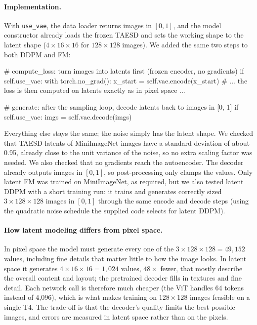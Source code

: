 \documentclass[11pt]{article}
\begin{document}
\paragraph{Implementation.} With \texttt{use\_vae}, the data loader returns images in $[0,1]$, and the
model constructor already loads the frozen TAESD and sets the working shape to the latent shape
($4\times16\times16$ for $128\times128$ images). We added the same two steps to both DDPM and FM:
\begin{codeblock}
# compute_loss: turn images into latents first (frozen encoder, no gradients)
if self.use_vae:
    with torch.no_grad():
        x_start = self.vae.encode(x_start)
# ... the loss is then computed on latents exactly as in pixel space ...

# generate: after the sampling loop, decode latents back to images in [0, 1]
if self.use_vae:
    imgs = self.vae.decode(imgs)
\end{codeblock}
Everything else stays the same; the noise simply has the latent shape. We checked that TAESD latents of
MiniImageNet images have a standard deviation of about 0.95, already close to the unit variance of the
noise, so no extra scaling factor was needed. We also checked that no gradients reach the autoencoder.
The decoder already outputs images in $[0,1]$, so post-processing only clamps the values.
Only latent FM was trained on MiniImageNet, as required, but we also tested latent DDPM with a short
training run: it trains and generates correctly sized $3\times128\times128$ images in $[0,1]$
through the same encode and decode steps (using the quadratic noise schedule the supplied code selects
for latent DDPM).

\paragraph{How latent modeling differs from pixel space.} In pixel space the model must generate every
one of the $3\times128\times128=49{,}152$ values, including fine details that matter little to how the
image looks. In latent space it generates $4\times16\times16=1{,}024$ values, $48\times$ fewer, that
mostly describe the overall content and layout; the pretrained decoder fills in textures and fine
detail. Each network call is therefore much cheaper (the ViT handles 64 tokens instead of 4{,}096), which
is what makes training on $128\times128$ images feasible on a single T4. The trade-off is that the
decoder's quality limits the best possible images, and errors are measured in latent space rather than
on the pixels.
\end{document}
